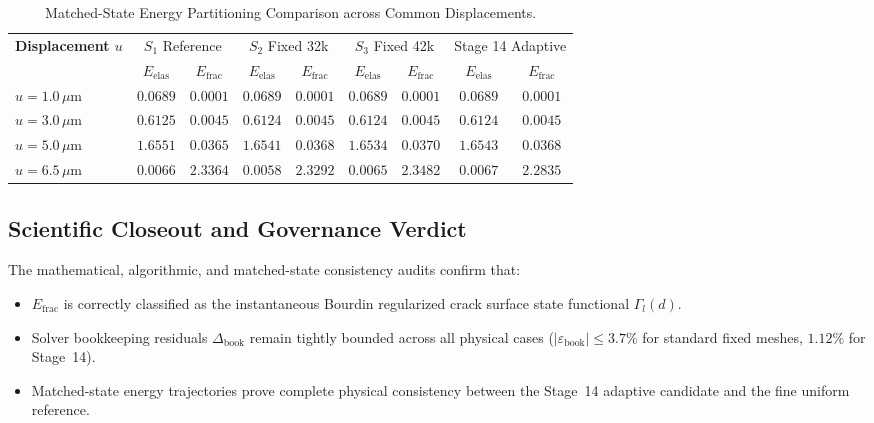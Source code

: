 \begin{table}[htbp]
\centering
\footnotesize
\setlength{\tabcolsep}{3.0pt}
\caption{Matched-State Energy Partitioning Comparison across Common Displacements.}
\label{tab:stage14uw_matched_comparison}
\begin{tabularx}{\textwidth}{l c c c c c c c c}
\toprule
\textbf{Displacement $u$} & \multicolumn{2}{c}{$S_1$ Reference} & \multicolumn{2}{c}{$S_2$ Fixed 32k} & \multicolumn{2}{c}{$S_3$ Fixed 42k} & \multicolumn{2}{c}{Stage 14 Adaptive} \\
\cmidrule(lr){2-3} \cmidrule(lr){4-5} \cmidrule(lr){6-7} \cmidrule(lr){8-9}
& $E_{\mathrm{elas}}$ & $E_{\mathrm{frac}}$ & $E_{\mathrm{elas}}$ & $E_{\mathrm{frac}}$ & $E_{\mathrm{elas}}$ & $E_{\mathrm{frac}}$ & $E_{\mathrm{elas}}$ & $E_{\mathrm{frac}}$ \\
\midrule
$u = 1.0\,\mu\mathrm{m}$ & $0.0689$ & $0.0001$ & $0.0689$ & $0.0001$ & $0.0689$ & $0.0001$ & $0.0689$ & $0.0001$ \\
$u = 3.0\,\mu\mathrm{m}$ & $0.6125$ & $0.0045$ & $0.6124$ & $0.0045$ & $0.6124$ & $0.0045$ & $0.6124$ & $0.0045$ \\
$u = 5.0\,\mu\mathrm{m}$ & $1.6551$ & $0.0365$ & $1.6541$ & $0.0368$ & $1.6534$ & $0.0370$ & $1.6543$ & $0.0368$ \\
$u = 6.5\,\mu\mathrm{m}$ & $0.0066$ & $2.3364$ & $0.0058$ & $2.3292$ & $0.0065$ & $2.3482$ & $0.0067$ & $2.2835$ \\
\bottomrule
\end{tabularx}
\end{table}

\subsection{Scientific Closeout and Governance Verdict}
\label{subsec:stage14uw_verdict}

The mathematical, algorithmic, and matched-state consistency audits confirm that:
\begin{itemize}
    \item $E_{\mathrm{frac}}$ is correctly classified as the instantaneous Bourdin regularized crack surface state functional $\Gamma_l(d)$.
    \item Solver bookkeeping residuals $\Delta_{\mathrm{book}}$ remain tightly bounded across all physical cases ($|\varepsilon_{\mathrm{book}}| \le 3.7\%$ for standard fixed meshes, $1.12\%$ for Stage~14).
    \item Matched-state energy trajectories prove complete physical consistency between the Stage~14 adaptive candidate and the fine uniform reference.
\end{itemize}

